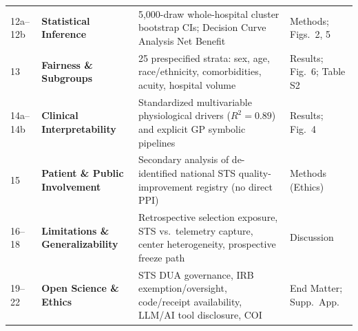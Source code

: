 \begin{table}[t]
\begin{tabularx}{\textwidth}{@{}L{1.15cm}L{3.1cm}YL{2.65cm}@{}}
12a--12b & \textbf{Statistical Inference} & 5,000-draw whole-hospital cluster bootstrap CIs; Decision Curve Analysis Net Benefit & Methods; Figs.\ 2, 5 \\
13 & \textbf{Fairness \& Subgroups} & 25 prespecified strata: sex, age, race/ethnicity, comorbidities, acuity, hospital volume & Results; Fig.\ 6; Table S2 \\
14a--14b & \textbf{Clinical Interpretability} & Standardized multivariable physiological drivers ($R^2=0.89$) and explicit GP symbolic pipelines & Results; Fig.\ 4 \\
15 & \textbf{Patient \& Public Involvement} & Secondary analysis of de-identified national STS quality-improvement registry (no direct PPI) & Methods (Ethics) \\
16--18 & \textbf{Limitations \& Generalizability} & Retrospective selection exposure, STS vs.\ telemetry capture, center heterogeneity, prospective freeze path & Discussion \\
19--22 & \textbf{Open Science \& Ethics} & STS DUA governance, IRB exemption/oversight, code/receipt availability, LLM/AI tool disclosure, COI & End Matter; Supp.\ App. \\
\bottomrule
\end{tabularx}
\end{table}
